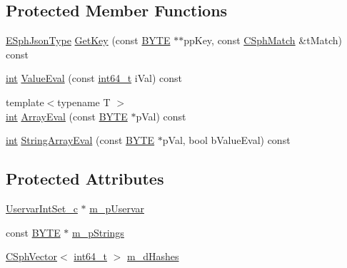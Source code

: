 \subsection*{Protected Member Functions}
\begin{DoxyCompactItemize}
\item 
\hyperlink{sphinxjson_8h_ad0338b1aabded682906629a3e477a2a8}{E\-Sph\-Json\-Type} \hyperlink{classExpr__JsonFieldIn__c_a8371b9894099831ee7da6b77a66a7332}{Get\-Key} (const \hyperlink{sphinxstd_8h_a4ae1dab0fb4b072a66584546209e7d58}{B\-Y\-T\-E} $\ast$$\ast$pp\-Key, const \hyperlink{classCSphMatch}{C\-Sph\-Match} \&t\-Match) const 
\item 
\hyperlink{sphinxexpr_8cpp_a4a26e8f9cb8b736e0c4cbf4d16de985e}{int} \hyperlink{classExpr__JsonFieldIn__c_a0e9a5bf872cc7056917e1a013293e60d}{Value\-Eval} (const \hyperlink{sphinxstd_8h_a996e72f71b11a5bb8b3b7b6936b1516d}{int64\-\_\-t} i\-Val) const 
\item 
{\footnotesize template$<$typename T $>$ }\\\hyperlink{sphinxexpr_8cpp_a4a26e8f9cb8b736e0c4cbf4d16de985e}{int} \hyperlink{classExpr__JsonFieldIn__c_a41eb79a51162d473faa9c2bbe24322bb}{Array\-Eval} (const \hyperlink{sphinxstd_8h_a4ae1dab0fb4b072a66584546209e7d58}{B\-Y\-T\-E} $\ast$p\-Val) const 
\item 
\hyperlink{sphinxexpr_8cpp_a4a26e8f9cb8b736e0c4cbf4d16de985e}{int} \hyperlink{classExpr__JsonFieldIn__c_a3dff36bb3b270f5c356cd78d24d218f4}{String\-Array\-Eval} (const \hyperlink{sphinxstd_8h_a4ae1dab0fb4b072a66584546209e7d58}{B\-Y\-T\-E} $\ast$p\-Val, bool b\-Value\-Eval) const 
\end{DoxyCompactItemize}
\subsection*{Protected Attributes}
\begin{DoxyCompactItemize}
\item 
\hyperlink{classUservarIntSet__c}{Uservar\-Int\-Set\-\_\-c} $\ast$ \hyperlink{classExpr__JsonFieldIn__c_a98af7bd2703d8e0c3aa62f4fdda5404d}{m\-\_\-p\-Uservar}
\item 
const \hyperlink{sphinxstd_8h_a4ae1dab0fb4b072a66584546209e7d58}{B\-Y\-T\-E} $\ast$ \hyperlink{classExpr__JsonFieldIn__c_aa8d184c2f9e484c188f4418f365ee61e}{m\-\_\-p\-Strings}
\item 
\hyperlink{classCSphVector}{C\-Sph\-Vector}$<$ \hyperlink{sphinxstd_8h_a996e72f71b11a5bb8b3b7b6936b1516d}{int64\-\_\-t} $>$ \hyperlink{classExpr__JsonFieldIn__c_a48fbe6751884fbbdb69389664bcc30a2}{m\-\_\-d\-Hashes}
\end{DoxyCompactItemize}



